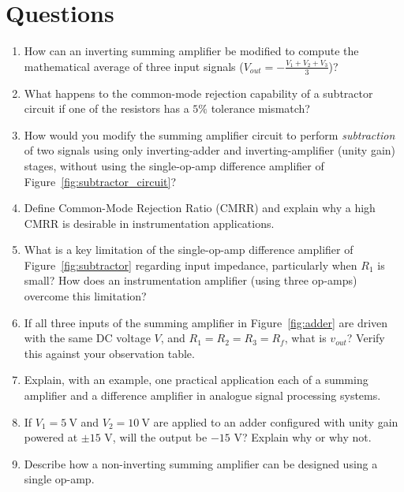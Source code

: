 \section{Questions}
\begin{enumerate}
	\item How can an inverting summing amplifier be modified to compute the mathematical average of three input signals ($V_{out} = -\frac{V_1 + V_2 + V_3}{3}$)?
	\item What happens to the common-mode rejection capability of a subtractor circuit if one of the resistors has a $5\%$ tolerance mismatch?
	\item How would you modify the summing amplifier circuit to perform \emph{subtraction} of two signals using only inverting-adder and inverting-amplifier (unity gain) stages, without using the single-op-amp difference amplifier of Figure~\ref{fig:subtractor_circuit}?
	\item Define Common-Mode Rejection Ratio (CMRR) and explain why a high CMRR is desirable in instrumentation applications.
	\item What is a key limitation of the single-op-amp difference amplifier of Figure~\ref{fig:subtractor} regarding input impedance, particularly when $R_1$ is small? How does an instrumentation amplifier (using three op-amps) overcome this limitation?
	\item If all three inputs of the summing amplifier in Figure~\ref{fig:adder} are driven with the same DC voltage $V$, and $R_1=R_2=R_3=R_f$, what is $v_{out}$? Verify this against your observation table.
	\item Explain, with an example, one practical application each of a summing amplifier and a difference amplifier in analogue signal processing systems.
	\item If $V_1 = \SI{5}{\volt}$ and $V_2 = \SI{10}{\volt}$ are applied to an adder configured with unity gain powered at $\pm 15\text{ V}$, will the output be $-15\text{ V}$? Explain why or why not.
	\item Describe how a non-inverting summing amplifier can be designed using a single op-amp.
\end{enumerate}
